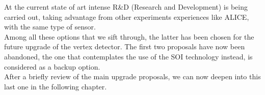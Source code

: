 At the current state of art intense R\&D (Research and Development) is being carried out, taking advantage from other experiments experiences like ALICE, with the same type of sensor.\\

Among all these options that we sift through, the latter has been chosen for the future upgrade of the vertex detector. The first two proposals have now been abandoned, the one that contemplates the use of the SOI technology instead, is considered as a backup option. \\

After a briefly review of the main upgrade proposals, we can now deepen into this last one in the following chapter.

